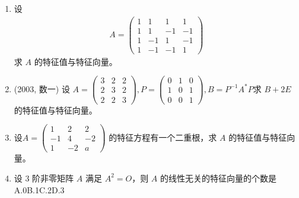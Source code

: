 \documentclass[12pt, a4paper, oneside, UTF8]{ctexbook}
\begin{document}
\begin{enumerate}[label=\arabic*.]
    \item 设
    \begin{align*}
    A = \begin{pmatrix}
    1 & 1 & 1 & 1 \\
    1 & 1 & -1 & -1\\
    1 & -1 & 1 & -1 \\
    1 & -1 & -1 & 1
    \end{pmatrix}
    \end{align*}
    求 $A$ 的特征值与特征向量。
    
    \begin{solution}
    \newpage
    \end{solution}
    
    \item (2003, 数一) 设
    $A = \begin{pmatrix}
    3 & 2 & 2 \\
    2 & 3 & 2 \\
    2 & 2 & 3
    \end{pmatrix},P=\begin{pmatrix}
        0 & 1 & 0 \\
        1 & 0 & 1 \\
        0 & 0 & 1 
    \end{pmatrix},B = P^{-1} A^* P$求 $B + 2E$ 的特征值与特征向量。
    
    \begin{solution}
    \newpage
    \end{solution}
    
    \item 设$
    A = \begin{pmatrix}
    1 & 2 & 2 \\
    -1 & 4 & -2 \\
    1 & -2 & a
    \end{pmatrix}$
    的特征方程有一个二重根，求 $A$ 的特征值与特征向量。
    
    \begin{solution}
    \newpage
    \end{solution}
    
    \item 设 3 阶非零矩阵 $A$ 满足 $A^2 = O$，则 $A$ 的线性无关的特征向量的个数是 \\
    A.0\qquad B.1\qquad C.2\qquad D.3
    
    \begin{solution}
    \newpage
    \end{solution}
    

\end{enumerate}
\end{document}
